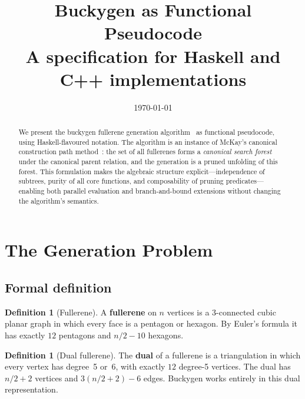 \documentclass[11pt,a4paper]{article}
\title{Buckygen as Functional Pseudocode\\[6pt]
\large A specification for Haskell and C++ implementations}
\author{}
\date{\today}
\theoremstyle{definition}
\newtheorem{definition}[theorem]{Definition}
\begin{document}
\maketitle

\begin{abstract}
We present the buckygen fullerene generation
algorithm~\cite{brinkmann_12} as functional pseudocode, using
Haskell-flavoured notation.  The algorithm is an instance of McKay's
canonical construction path method~\cite{mckay_98}: the set of all
fullerenes forms a \emph{canonical search forest} under the canonical
parent relation, and the generation is a pruned unfolding of this
forest.  This formulation makes the algebraic structure
explicit---independence of subtrees, purity of all core functions, and
composability of pruning predicates---enabling both parallel evaluation
and branch-and-bound extensions without changing the algorithm's
semantics.
\end{abstract}

\tableofcontents
\newpage

\section{The Generation Problem}
\label{sec:problem}

\subsection{Formal definition}

\begin{definition}[Fullerene]
A \textbf{fullerene} on $n$ vertices is a 3-connected cubic planar
graph in which every face is a pentagon or hexagon.  By Euler's formula
it has exactly $12$ pentagons and $n/2 - 10$ hexagons.
\end{definition}

\begin{definition}[Dual fullerene]
The \textbf{dual} of a fullerene is a triangulation in which every
vertex has degree~5 or~6, with exactly $12$ degree-5 vertices.  The
dual has $n/2 + 2$ vertices and $3(n/2 + 2) - 6$ edges.  Buckygen
works entirely in this dual representation.
\end{definition}
\end{document}
